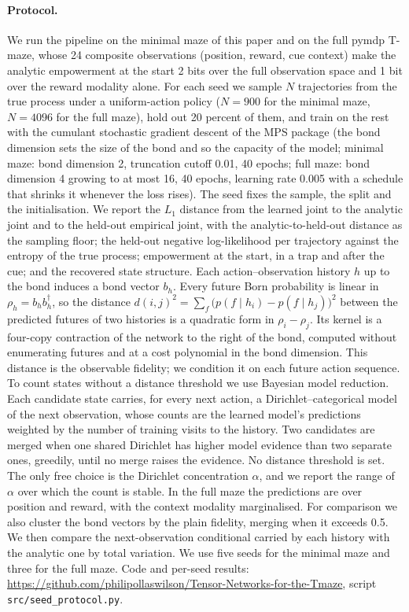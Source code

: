 \documentclass[letterpaper]{article} %
\theoremstyle{definition}
\begin{document}
\paragraph{Protocol.} We run the pipeline on the minimal maze of this paper and on the full pymdp T-maze, whose 24 composite observations (position, reward, cue context) make the analytic empowerment at the start 2 bits over the full observation space and 1 bit over the reward modality alone. For each seed we sample $N$ trajectories from the true process under a uniform-action policy ($N = 900$ for the minimal maze, $N = 4096$ for the full maze), hold out 20 percent of them, and train on the rest with the cumulant stochastic gradient descent of the MPS package (the bond dimension sets the size of the bond and so the capacity of the model; minimal maze: bond dimension 2, truncation cutoff 0.01, 40 epochs; full maze: bond dimension 4 growing to at most 16, 40 epochs, learning rate 0.005 with a schedule that shrinks it whenever the loss rises). The seed fixes the sample, the split and the initialisation. We report the $L_1$ distance from the learned joint to the analytic joint and to the held-out empirical joint, with the analytic-to-held-out distance as the sampling floor; the held-out negative log-likelihood per trajectory against the entropy of the true process; empowerment at the start, in a trap and after the cue; and the recovered state structure. Each action--observation history $h$ up to the bond induces a bond vector $b_h$. Every future Born probability is linear in $\rho_h = b_h b_h^\dagger$, so the distance $d(i,j)^2 = \sum_f \big(p(f \mid h_i) - p(f \mid h_j)\big)^2$ between the predicted futures of two histories is a quadratic form in $\rho_i - \rho_j$. Its kernel is a four-copy contraction of the network to the right of the bond, computed without enumerating futures and at a cost polynomial in the bond dimension. This distance is the observable fidelity; we condition it on each future action sequence. To count states without a distance threshold we use Bayesian model reduction. Each candidate state carries, for every next action, a Dirichlet--categorical model of the next observation, whose counts are the learned model's predictions weighted by the number of training visits to the history. Two candidates are merged when one shared Dirichlet has higher model evidence than two separate ones, greedily, until no merge raises the evidence. No distance threshold is set. The only free choice is the Dirichlet concentration $\alpha$, and we report the range of $\alpha$ over which the count is stable. In the full maze the predictions are over position and reward, with the context modality marginalised. For comparison we also cluster the bond vectors by the plain fidelity, merging when it exceeds 0.5. We then compare the next-observation conditional carried by each history with the analytic one by total variation. We use five seeds for the minimal maze and three for the full maze. Code and per-seed results: \url{https://github.com/philipollaswilson/Tensor-Networks-for-the-Tmaze}, script \texttt{src/seed\_protocol.py}.
\end{document}
